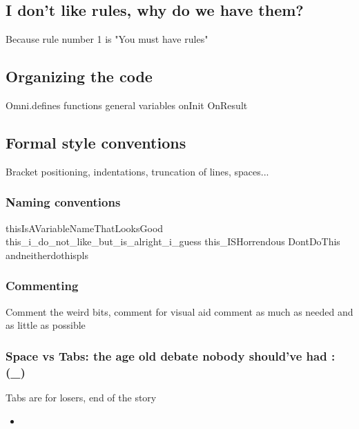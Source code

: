 \subsection{I don't like rules, why do we have them?}
\label{sub:rules}
Because rule number 1 is "You must have rules"

\subsection{Organizing the code}
\label{sub:order}
Omni.defines \newline
functions \newline
general variables \newline
onInit \newline
OnResult 

\subsection{Formal style conventions}
\label{sub:codeStyle}
Bracket positioning, indentations, truncation of lines, spaces... 

\subsubsection{Naming conventions}
\label{subsub:nameVariables}
thisIsAVariableNameThatLooksGood\newline
this\_i\_do\_not\_like\_but\_is\_alright\_i\_guess\newline
this\_ISHorrendous\newline
DontDoThis\newline
andneitherdothispls\newline

\subsubsection{Commenting}
\label{subsub:comment}

Comment the weird bits, comment for visual aid
comment as much as needed and as little as possible

\subsubsection{Space vs Tabs: the age old debate nobody should've had :(\_)}
\label{subsub:tabSpace}
Tabs are for losers, end of the story

\begin{itemize}
    \item
\end{itemize}
